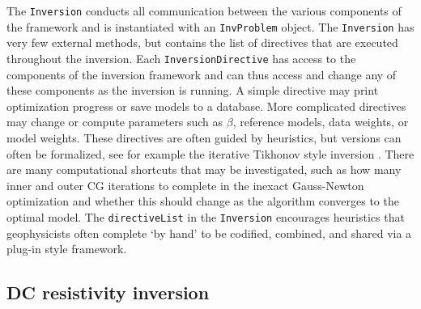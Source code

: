 \documentclass[preprint,review,3p,times,onecolumn,authoryear]{elsarticle}
\newcommand{\InvProblem}{\texttt{InvProblem}\xspace}
\newcommand{\Inversion}{\texttt{Inversion}\xspace}
\begin{document}
The \Inversion conducts all communication between the various components of the framework
and is instantiated with an \InvProblem object.
The \Inversion has very few external methods, but contains the list of directives that are executed throughout the inversion.
Each \texttt{InversionDirective} has access to the components of the inversion framework and can thus access and change any of these components as the inversion is running.
A simple directive may print optimization progress or save models to a database.
More complicated directives may change or compute parameters such as $\beta$, reference models, data weights, or model weights. These directives are often guided by heuristics, but versions can often be formalized, see for example the iterative Tikhonov style inversion \citep{tikhonov1977solutions,parker1994geophysical,DougTutorial}.
There are many computational shortcuts that may be investigated, such as how many inner and outer CG iterations to complete in the inexact Gauss-Newton optimization and whether this should change as the algorithm converges to the optimal model.
The \texttt{directiveList} in the \Inversion encourages heuristics that geophysicists often complete `by hand' to be codified, combined, and shared via a plug-in style framework.

\subsection{DC resistivity inversion}
\end{document}
